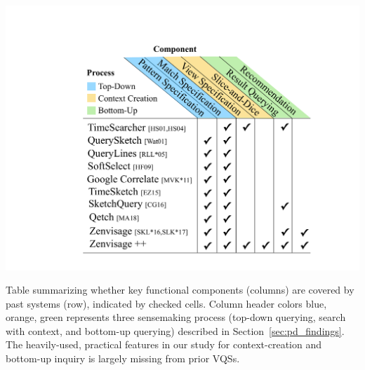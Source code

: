   \begin{table}[h!]
    \vspace*{-10pt}
     \centering
     \includegraphics[width=0.8\linewidth]{figures/related_works_table.pdf}
     \caption{Table summarizing whether key functional components (columns) are covered by past systems (row), indicated by checked cells. Column header colors blue, orange, green represents three sensemaking process (top-down querying, search with context, and bottom-up querying) described in Section~\ref{sec:pd_findings}. The heavily-used, practical features in our study for context-creation and bottom-up inquiry is largely missing from prior VQSs.}
     \label{table:relatedwork}
     \vspace*{-15pt}
 \end{table}